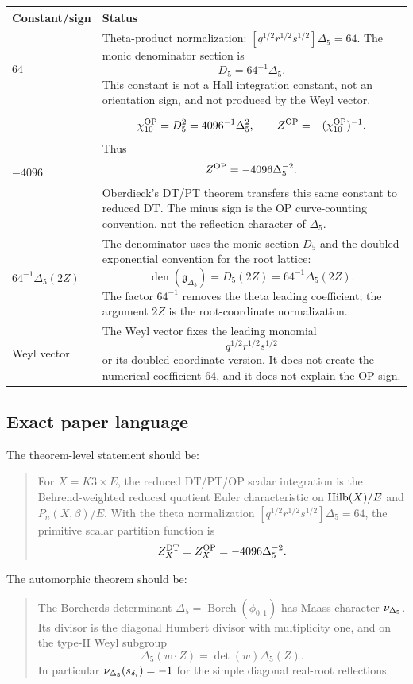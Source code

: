 \begin{center}
\small
\begin{tabular}{p{}p{}}
\hline
Constant/sign & Status \\
\hline
\(64\) &
Theta-product normalization:
\([q^{1/2}r^{1/2}s^{1/2}]\Delta_5=64\).  The monic denominator
section is
\[
  D_5=64^{-1}\Delta_5.
\]
This constant is not a Hall integration constant, not an orientation
sign, and not produced by the Weyl vector. \\
\(-4096\) &
\[
  \chi_{10}^{\mathrm{OP}}=D_5^2=4096^{-1}\Delta_5^2,
  \qquad
  Z^{\mathrm{OP}}=-(\chi_{10}^{\mathrm{OP}})^{-1}.
\]
Thus
\[
  Z^{\mathrm{OP}}=-4096\Delta_5^{-2}.
\]
Oberdieck's DT/PT theorem transfers this same constant to reduced DT.
The minus sign is the OP curve-counting convention, not the reflection
character of \(\Delta_5\). \\
\(64^{-1}\Delta_5(2Z)\) &
The denominator uses the monic section \(D_5\) and the doubled
exponential convention for the root lattice:
\[
  \operatorname{den}(\mathfrak g_{\Delta_5})
  =
  D_5(2Z)
  =
  64^{-1}\Delta_5(2Z).
\]
The factor \(64^{-1}\) removes the theta leading coefficient; the
argument \(2Z\) is the root-coordinate normalization. \\
Weyl vector &
The Weyl vector fixes the leading monomial
\[
  q^{1/2}r^{1/2}s^{1/2}
\]
or its doubled-coordinate version.  It does not create the numerical
coefficient \(64\), and it does not explain the OP sign. \\
\hline
\end{tabular}
\end{center}

\subsection{Exact paper language}

The theorem-level statement should be:

\begin{quote}
For \(X=K3\times E\), the reduced DT/PT/OP scalar integration is the
Behrend-weighted reduced quotient Euler characteristic on
\(\operatorname{Hilb}(X)/E\) and \(P_n(X,\beta)/E\).  With the theta normalization
\([q^{1/2}r^{1/2}s^{1/2}]\Delta_5=64\), the primitive scalar partition
function is
\[
  Z_{X}^{\mathrm{DT}}=Z_X^{\mathrm{OP}}=-4096\Delta_5^{-2}.
\]
\end{quote}

The automorphic theorem should be:

\begin{quote}
The Borcherds determinant \(\Delta_5=\operatorname{Borch}(\phi_{0,1})\)
has Maass character \(\nu_{\Delta_5}\).  Its divisor is the diagonal Humbert
divisor with multiplicity one, and on the type-II Weyl subgroup
\[
  \Delta_5(w\cdot Z)=\det(w)\Delta_5(Z).
\]
In particular \(\nu_{\Delta_5}(s_{\delta_i})=-1\) for the simple diagonal
real-root reflections.
\end{quote}

